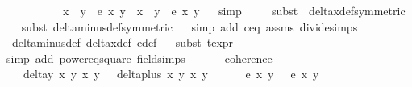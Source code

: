 \begin{isabellebody}
\ \ \ \ \ \ \ \ \ {\isacharequal}\ x{}\ {\isacharasterisk}\ y{}\ {\isacharasterisk}\ e{\isacharprime}\ x{}\ y{}\ {\isacharminus}\ x{}\ {\isacharasterisk}\ y{}\ {\isacharasterisk}\ e{\isacharprime}\ x{}\ y{}{\isachardoublequoteclose}\isanewline
%
\isadelimproof
\ \ %
\endisadelimproof
%
\isatagproof
{}\isamarkupfalse%
{\isacharparenleft}simp{\isacharparenright}\ \ \isanewline
\ \ \isamarkupfalse%
{\isacharparenleft}subst\ {\isacharparenleft}{}{\isacharparenright}\ delta{\isacharunderscore}x{\isacharunderscore}def{\isacharbrackleft}symmetric{\isacharbrackright}{\isacharparenright}\isanewline
\ \ \isamarkupfalse%
{\isacharparenleft}subst\ delta{\isacharunderscore}minus{\isacharunderscore}def{\isacharbrackleft}symmetric{\isacharbrackright}{\isacharparenright}\isanewline
\ \ \isamarkupfalse%
{\isacharparenleft}simp\ add{\isacharcolon}\ c{\isacharunderscore}eq{\isacharunderscore}{}\ assms{\isacharparenleft}{}{\isacharcomma}{}{\isacharparenright}\ divide{\isacharunderscore}simps{\isacharparenright}\isanewline
\ \ \isamarkupfalse%
\ delta{\isacharunderscore}minus{\isacharunderscore}def\ delta{\isacharunderscore}x{\isacharunderscore}def\ e{\isacharprime}{\isacharunderscore}def\isanewline
\ \ \isamarkupfalse%
{\isacharparenleft}subst\ t{\isacharunderscore}expr{\isacharparenright}{\isacharplus}\isanewline
\ \ \isamarkupfalse%
{\isacharparenleft}simp\ add{\isacharcolon}\ power{}{\isacharunderscore}eq{\isacharunderscore}square\ field{\isacharunderscore}simps{\isacharparenright}%
\endisatagproof
{\isafoldproof}%
%
\isadelimproof
\ \ \isanewline
%
\endisadelimproof
\ \ \isanewline
{}\isamarkupfalse%
\ coherence{\isacharunderscore}{}{\isacharcolon}\isanewline
\ \ \ {\isachardoublequoteopen}delta{\isacharunderscore}y\ x{}\ y{}\ x{}\ y{}\ {\isasymnoteq}\ {}{\isachardoublequoteclose}\ {\isachardoublequoteopen}delta{\isacharunderscore}plus\ x{}\ y{}\ x{}\ y{}\ {\isasymnoteq}\ {}{\isachardoublequoteclose}\ \isanewline
\ \ \ {\isachardoublequoteopen}e{\isacharprime}\ x{}\ y{}\ {\isacharequal}\ {}{\isachardoublequoteclose}\ {\isachardoublequoteopen}e{\isacharprime}\ x{}\ y{}\ {\isacharequal}\ {}{\isachardoublequoteclose}\isanewline

\end{isabellebody}
